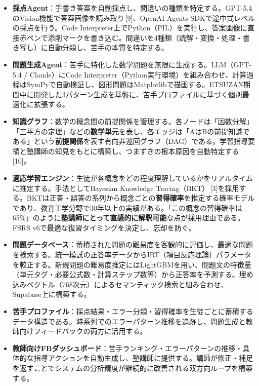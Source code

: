 \documentclass[paper=a4,fontsize=10.5bp,jafontsize=10.5bp,twocolumn]{jlreq}
\begin{document}
\begin{itemize}
  \item \textbf{採点Agent}：手書き答案を自動採点し、間違いの種類を特定する。GPT-5.4のVision機能で答案画像を読み取り\,[9]、OpenAI Agents SDKで途中式レベルの採点を行う。Code Interpreter上でPython（PIL）を実行し、答案画像に直接赤ペンで添削マークを書き込む。間違いを4種類（読解・変換・処理・書き写し）に自動分類し、苦手の本質を特定する。

  \item \textbf{問題生成Agent}：苦手に特化した数学問題を無限に生成する。LLM（GPT-5.4 / Claude）にCode Interpreter（Python実行環境）を組み合わせ、計算過程はSymPyで自動検証し、図形問題はMatplotlibで描画する。ETSUZAN期間中に開発した3パターン生成を基盤に、苦手プロファイルに基づく個別最適化に拡張する。

  \item \textbf{知識グラフ}：数学の概念間の前提関係を管理する。各ノードは「因数分解」「三平方の定理」などの\textbf{数学単元}を表し、各エッジは「AはBの前提知識である」という\textbf{前提関係}を表す有向非巡回グラフ（DAG）である。学習指導要領と塾講師の知見をもとに構築し、つまずきの根本原因を自動特定する\,[10]。

  \item \textbf{適応学習エンジン}：生徒が各概念をどの程度理解しているかをリアルタイムに推定する。手法としてBayesian Knowledge Tracing（BKT）\,[3]を採用する。BKTは正答・誤答の系列から概念ごとの\textbf{習得確率}を推定する確率モデルであり、教育工学分野で30年以上の実績がある。「この概念の習得確率は65\%」のように\textbf{塾講師にとって直感的に解釈可能}な点が採用理由である。FSRS v6で最適な復習タイミングを決定し、忘却を防ぐ。

  \item \textbf{問題データベース}：蓄積された問題の難易度を客観的に評価し、最適な問題を検索する。統一模試の正答率データからIRT（項目反応理論）パラメータを較正する。新規問題の難易度推定にはLightGBMを用い、問題文の特徴量（単元タグ・必要公式数・計算ステップ数等）から正答率を予測する。埋め込みベクトル（768次元）によるセマンティック検索と組み合わせ、Supabase上に構築する。

  \item \textbf{苦手プロファイル}：採点結果・エラー分類・習得確率を生徒ごとに蓄積するデータ構造である。時系列でのエラーパターン推移を追跡し、問題生成と教師向けフィードバックの両方に活用する。

  \item \textbf{教師向けFBダッシュボード}：苦手ランキング・エラーパターンの推移・具体的な指導アクションを自動生成し、塾講師に提供する。講師が修正・補足を返すことでシステムの分析精度が継続的に改善される双方向ループを構築する。
\end{itemize}
\end{document}
